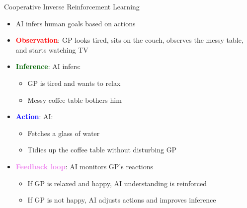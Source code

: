 \documentclass[
  10pt,
  ignorenonframetext,
]{beamer}
\providecommand{\tightlist}{%
  \setlength{\itemsep}{0pt}\setlength{\parskip}{0pt}}
\begin{document}
\begin{frame}{Cooperative Inverse Reinforcement Learning}
\label{cooperative-inverse-reinforcement-learning}
\begin{itemize}
\item
  AI infers human goals based on actions
\item
  \textbf{\textcolor{red}{Observation}}: GP looks tired, sits on the
  couch, observes the messy table, and starts watching TV
\item
  \textbf{\textcolor{darkgreen}{Inference}}: AI infers:

  \begin{itemize}
  \tightlist
  \item
    GP is tired and wants to relax
  \item
    Messy coffee table bothers him
  \end{itemize}
\item
  \textbf{\textcolor{blue}{Action}}: AI:

  \begin{itemize}
  \tightlist
  \item
    Fetches a glass of water
  \item
    Tidies up the coffee table without disturbing GP
  \end{itemize}
\item
  \textbf{\textcolor{violet}{Feedback loop}}: AI monitors GP's reactions

  \begin{itemize}
  \tightlist
  \item
    If GP is relaxed and happy, AI understanding is reinforced
  \item
    If GP is not happy, AI adjusts actions and improves inference
  \end{itemize}
\end{itemize}
\end{frame}
\end{document}
